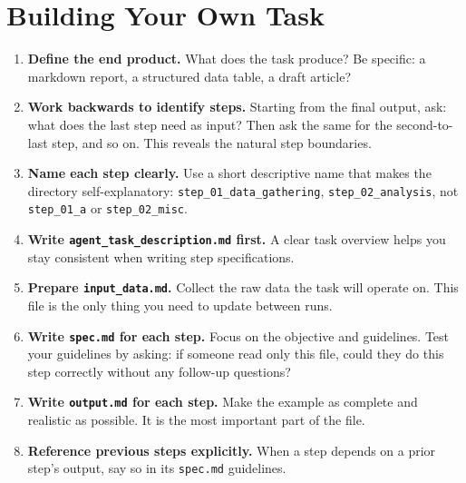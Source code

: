 \documentclass[12pt, a4paper]{article}
\begin{document}
\clearpage
\section{Building Your Own Task}

\begin{enumerate}[leftmargin=1.5em]
  \item \textbf{Define the end product.} What does the task produce? Be specific: a markdown report, a structured data table, a draft article?

  \item \textbf{Work backwards to identify steps.} Starting from the final output, ask: what does the last step need as input? Then ask the same for the second-to-last step, and so on. This reveals the natural step boundaries.

  \item \textbf{Name each step clearly.} Use a short descriptive name that makes the directory self-explanatory: \texttt{step\_01\_data\_gathering}, \texttt{step\_02\_analysis}, not \texttt{step\_01\_a} or \texttt{step\_02\_misc}.

  \item \textbf{Write \texttt{agent\_task\_description.md} first.} A clear task overview helps you stay consistent when writing step specifications.

  \item \textbf{Prepare \texttt{input\_data.md}.} Collect the raw data the task will operate on. This file is the only thing you need to update between runs.

  \item \textbf{Write \texttt{spec.md} for each step.} Focus on the objective and guidelines. Test your guidelines by asking: if someone read only this file, could they do this step correctly without any follow-up questions?

  \item \textbf{Write \texttt{output.md} for each step.} Make the example as complete and realistic as possible. It is the most important part of the file.

  \item \textbf{Reference previous steps explicitly.} When a step depends on a prior step's output, say so in its \texttt{spec.md} guidelines.
\end{enumerate}
\end{document}
